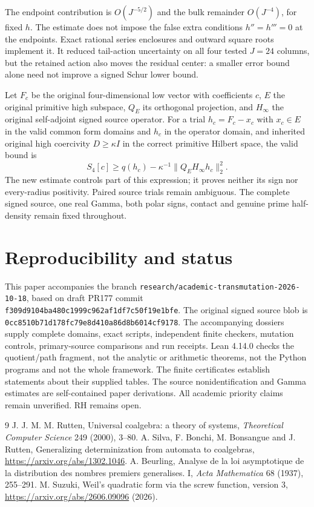 \documentclass[11pt]{article}
\begin{document}
The endpoint contribution is $O(J^{-5/2})$ and the bulk remainder
$O(J^{-4})$, for fixed $h$. The estimate does not impose the false extra
conditions $h''=h'''=0$ at the endpoints. Exact rational series enclosures
and outward square roots implement it. It reduced tail-action uncertainty
on all four tested $J=24$ columns,
but the retained action also moves the residual center: a smaller error
bound alone need not improve a signed Schur lower bound.

Let $F_c$ be the original four-dimensional low vector with coefficients $c$,
$E$ the original primitive high subspace, $Q_E$ its orthogonal projection,
and $H_\infty$ the original self-adjoint signed source operator. For a trial
$h_c=F_c-x_c$ with $x_c\in E$ in the valid common form domains and $h_c$ in
the operator domain, and inherited original high coercivity $D\ge\kappa I$
in the correct primitive Hilbert space, the valid bound is
\[
S_4[c]\ge q(h_c)-\kappa^{-1}\|Q_EH_\infty h_c\|_2^2.
\]
The new estimate controls part of this expression; it proves neither its sign
nor every-radius positivity. Paired source trials remain ambiguous. The
complete signed source, one real Gamma, both polar signs, contact and genuine
prime half-density remain fixed throughout.

\section{Reproducibility and status}
This paper accompanies the branch \texttt{research/academic-transmutation-2026-10-18},
based on draft PR177 commit \texttt{f309d9104ba480c1999c962af1df7c50f19e1bfe}.
The original signed source blob is
\texttt{0cc8510b71d178fc79e8d410a86d8b6014cf9178}.
The accompanying dossiers supply complete domains, exact scripts, independent
finite checkers, mutation controls, primary-source comparisons and run receipts.
Lean 4.14.0 checks the quotient/path fragment, not the analytic or arithmetic
theorems, not the Python programs and not the whole framework. The finite
certificates establish statements about their supplied tables. The source
nonidentification and Gamma estimates are self-contained paper derivations.
All academic priority claims remain unverified. RH remains open.

\begin{thebibliography}{9}
 J. J. M. M. Rutten, Universal coalgebra: a theory of systems,
\emph{Theoretical Computer Science} 249 (2000), 3--80.
 A. Silva, F. Bonchi, M. Bonsangue and J. Rutten,
Generalizing determinization from automata to coalgebras,
\url{https://arxiv.org/abs/1302.1046}.
 A. Beurling, Analyse de la loi asymptotique de la distribution
des nombres premiers generalises. I, \emph{Acta Mathematica} 68 (1937), 255--291.
 M. Suzuki, Weil's quadratic form via the screw function,
version 3, \url{https://arxiv.org/abs/2606.09096} (2026).
\end{thebibliography}
\end{document}
